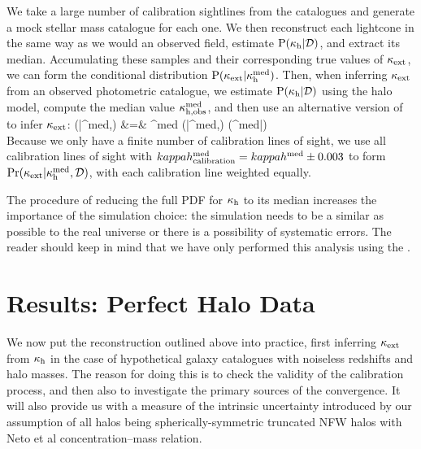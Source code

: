 \documentclass[useAMS,usenatbib]{mn2e}
\begin{document}
We  take a large number of
calibration sightlines from the \MS catalogues and generate a mock
stellar mass catalogue for each one. We then reconstruct each lightcone in the
same way as we would an observed field,
estimate ${\rm P}(\kappa_{\rm h}|{\mathcal{D}})$, and extract its median. Accumulating
these samples and their corresponding true values of $\kappa_{\rm ext}$, we can form the 
conditional distribution ${\rm P}(\kappa_{\rm ext}|\kappa_{\rm h}^{\rm med})$. 
Then, when inferring $\kappa_{\rm ext}$ from an observed photometric catalogue, we 
estimate ${\rm P}(\kappa_{\rm h}|{\mathcal{D}})$ 
using the halo model, compute the median value 
$\kappa_{\rm h,obs}^{\rm med}$, and then use an alternative
version of 
 to infer $\kappa_{\rm ext}$: 
\bea
\Pr(\kappax|\kappah^{\rm med},) &=& \int \dee\kappah^{\rm med} 
   \Pr(\kappax|\kappah^{\rm med},) \Pr(\kappah^{\rm med}|) \notag \\
\label{eq:calkappaconv}   
\eea
Because we only have a finite number of calibration lines of sight, we use all calibration
lines of sight with $kappah_{\rm calibration}^{\rm med} = kappah^{\rm med}\pm0.003$ to form
$\Pr(\kappa_{\rm ext}|\kappa_{\rm h}^{\rm med},\mathcal{D})$, with each calibration line weighted
equally. 

The procedure of reducing the full PDF for $\kappa_{\rm h}$ to its median increases the 
importance of the simulation choice: the simulation needs to be a similar as possible
to the real universe or there is a possibility of systematic errors. The reader
should keep in mind that we have only performed this analysis using the \MS.


\section{Results: Perfect Halo Data}
\label{sec:knownMh+z} 

We now put the reconstruction \proceedure outlined above into practice, first
inferring $\kappa_{\rm ext}$ from $\kappa_{\rm h}$ in the case of hypothetical galaxy catalogues
with noiseless redshifts and halo masses. The reason for doing this is to
check the validity of the calibration process, and then also to  investigate
the primary sources of the convergence. It will also provide us with a measure
of the intrinsic uncertainty introduced by our assumption of all halos being
spherically-symmetric truncated NFW halos with Neto et al concentration--mass
relation.

\end{document}
